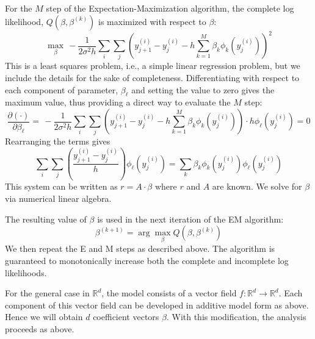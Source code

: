 \documentclass[12pt]{article}
\begin{document}
For the $M$ step of the Expectation-Maximization algorithm, the complete log likelihood, $Q(\beta,\beta^{(k)})$ is maximized with respect to $\beta$:
$$
\max_{\beta} \, -\frac{1}{2 \sigma^2 h} \sum_{i} \sum_{j} (y_{j+1}^{(i)} - y_j^{(i)} - h \sum_{k=1}^{M} \beta_k \phi_k(y_j^{(i)}))^2
$$
This is a least squares problem, i.e., a simple linear regression problem, but we include the details for the sake of completeness.  Differentiating with respect to each component of parameter, $\beta_{\ell}$ and setting the value to zero gives the maximum value, thus providing a direct way to evaluate the $M$ step:
$$
\frac{\partial (\cdot)}{\partial \beta_{\ell}} = \, -\frac{1}{2 \sigma^2 h} \sum_{i} \sum_{j} (y_{j+1}^{(i)} - y_j^{(i)} - h \sum_{k=1}^{M} \beta_k \phi_k(y_j^{(i)})) \cdot h \phi_{\ell}(y_j^{(i)}) = 0
$$
Rearranging the terms gives
$$
\sum_{i} \sum_{j} (\frac{y_{j+1}^{(i)} - y_j^{(i)}}{h}) \phi_{\ell}(y_{j}^{(i)}) = \sum_{k} \beta_k \phi_k(y_j^{(i)}) \phi_{\ell} (y_j^{(i)})
$$
This system can be written as $r = A \cdot \beta$ where $r$ and $A$ are known. We solve for $\beta$ via numerical linear algebra.

The resulting value of $\beta$ is used in the next iteration of the EM algorithm:
$$
\beta^{(k+1)} = \arg \max_{\beta} Q(\beta, \beta^{(k)})
$$
We then repeat the E and M steps as described above.  The algorithm is guaranteed to monotonically increase both the complete and incomplete log likelihoods.

For the general case in $\mathbb{R}^d$, the model consists of a vector field $f: \mathbb{R}^d \to \mathbb{R}^d$.  Each component of this vector field can be developed in additive model form as above.  Hence we will obtain $d$ coefficient vectors $\beta$.  With this modification, the analysis proceeds as above.
\end{document}
